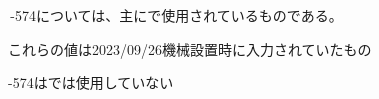\clearpage
\,-\ttNum574については、主に\bundledNCPrg{}で使用されているものである。
\begin{marker}
これらの値は2023/09/26機械設置時に入力されていたもの
\end{marker}
\begin{marker}
-\ttNum574は\createdNCPrg では使用していない
\end{marker}


